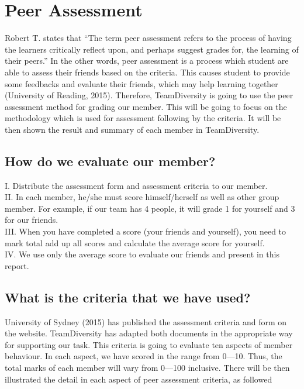 \documentclass[11pt]{article}
\begin{document}
\newpage	
\section{Peer Assessment}

\indent\indent Robert T. \cite{roberts2006self} states that “The term peer assessment refers to the process of having the learners critically reflect upon, and perhaps suggest grades for, the learning of their peers.” In the other words, peer assessment is a process which student are able to assess their friends based on the criteria. This causes student to provide some feedbacks and evaluate their friends, which may help learning together (University of Reading, 2015). Therefore, TeamDiversity is going to use the peer assessment method for grading our member. This will be going to focus on the methodology which is used for assessment following by the criteria. It will be then shown the result and summary of each member in TeamDiversity. 
	\subsection{How do we evaluate our member?}
	
	\indent\indent I. Distribute the assessment form and assessment criteria to our member.\\
	\indent II. In each member, he/she must score himself/herself as well as other group member. For example, if our team has 4 people, it will grade 1 for yourself and 3 for our friends.\\
	\indent III. When you have completed a score (your friends and yourself), you need to mark total add up all scores and calculate the average score for yourself. \\
	\indent IV. We use only the average score to evaluate our friends and present in this report. 


	\subsection{What is the criteria that we have used?}
		\indent University of Sydney (2015) has published the assessment criteria and form on the website. TeamDiversity has adapted both documents in the appropriate way for supporting our task. This criteria is going to evaluate ten aspects of member behaviour. In each aspect, we have scored in the range from 0—10. Thus, the total marks of each member will vary from 0—100 inclusive. There will be then illustrated the detail in each aspect of peer assessment criteria, as followed \newline 
\end{document}
